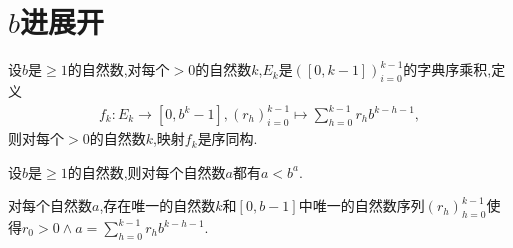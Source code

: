 \section{\texorpdfstring{$b$}{b}进展开}

\begin{proposition}{}{}
	设$b$是$\geq 1$的自然数,对每个$>0$的自然数$k$,$E_{k}$是$\left(\left[0,k-1\right]\right)_{i=0}^{k-1}$的字典序乘积,定义
	\begin{align*}
		f_{k}:E_{k}\to\left[0,b^{k}-1\right],\left(r_{h}\right)_{i=0}^{k-1}\mapsto\sum\limits_{h=0}^{k-1}r_{h}b^{k-h-1},
	\end{align*}
	则对每个$>0$的自然数$k$,映射$f_{k}$是序同构.
\end{proposition}

\begin{proposition}{}{}
	设$b$是$\geq 1$的自然数,则对每个自然数$a$都有$a<b^{a}$.
\end{proposition}

\begin{proposition}{}{}
	对每个自然数$a$,存在唯一的自然数$k$和$\left[0,b-1\right]$中唯一的自然数序列$\left(r_{h}\right)_{h=0}^{k-1}$使得$r_{0}>0\wedge a=\sum\limits_{h=0}^{k-1}r_{h}b^{k-h-1}$.
\end{proposition}

